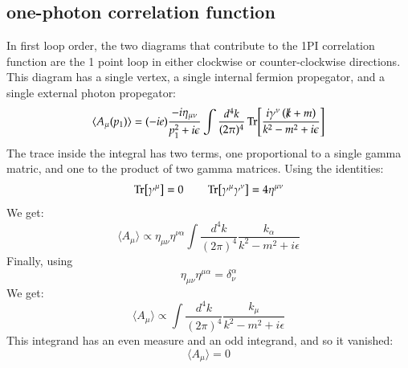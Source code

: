 \documentclass{article}
\begin{document}
\subsection{one-photon correlation function}
In first loop order, the two diagrams that contribute to the 1PI correlation function are the 1 point loop in either clockwise or counter-clockwise directions. This diagram has a single vertex, a single internal fermion propegator, and a single external photon propegator:
\begin{equation}
    \langle A_\mu(p_1) \rangle = (-ie)\frac{-i\eta_{\mu\nu}}{p_1^2 + i\epsilon}\int \frac{d^4k}{(2\pi)^4}\Tr[\frac{i\gamma^\nu \left(\slashed{k} + m\right)}{k^2 - m^2 + i\epsilon}]
\end{equation}
The trace inside the integral has two terms, one proportional to a single gamma matric, and one to the product of two gamma matrices. Using the identities:
\begin{equation}
    \Tr[\gamma^\mu] = 0
    \qquad
    \Tr[\gamma^\mu\gamma^\nu] = 4\eta^{\mu\nu}
\end{equation}
We get:
\begin{equation}
    \langle A_\mu \rangle \propto \eta_{\mu\nu} \eta^{\nu\alpha} \int \frac{d^4k}{(2\pi)^4}\frac{k_\alpha}{k^2 - m^2 + i\epsilon}
\end{equation}
Finally, using
\begin{equation}
    \eta_{\mu\nu} \eta^{\mu\alpha} = \delta_\nu^\alpha
\end{equation}
We get:
\begin{equation}
    \langle A_\mu \rangle \propto \int \frac{d^4k}{(2\pi)^4}\frac{k_\mu}{k^2 - m^2 + i\epsilon}
\end{equation}
This integrand has an even measure and an odd integrand, and so it vanished:
\begin{equation}
    \langle A_\mu \rangle = 0
\end{equation}
\end{document}

